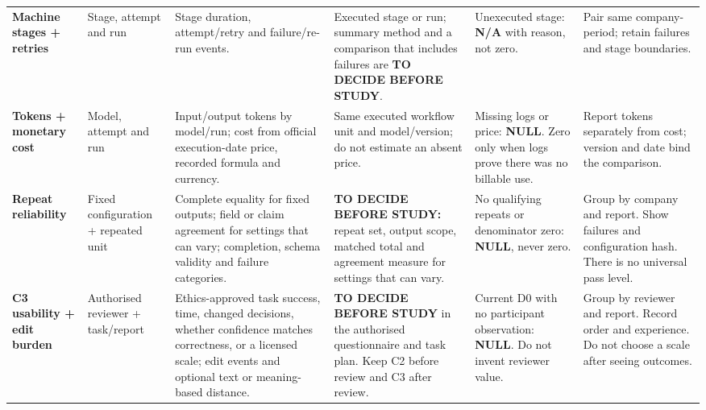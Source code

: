 \begin{longtable}{@{}P{0.14\textwidth}P{0.10\textwidth}P{0.19\textwidth}P{0.195\textwidth}P{0.15\textwidth}P{0.175\textwidth}@{}}
    \addlinespace[1.5pt]
    \textbf{Machine stages + retries} &
    Stage, attempt and run &
    Stage duration, attempt/retry and failure/re-run events. &
    Executed stage or run; summary method and a comparison that includes failures are \textbf{TO DECIDE BEFORE STUDY}. &
    Unexecuted stage: \textbf{N/A} with reason, not zero. &
    Pair same company-period; retain failures and stage boundaries. \\

    \addlinespace[1.5pt]
    \textbf{Tokens + monetary cost} &
    Model, attempt and run &
    Input/output tokens by model/run; cost from official execution-date price, recorded formula and currency. &
    Same executed workflow unit and model/version; do not estimate an absent price. &
    Missing logs or price: \textbf{NULL}. Zero only when logs prove there was no billable use. &
    Report tokens separately from cost; version and date bind the comparison. \\

    \addlinespace[1.5pt]
    \textbf{Repeat reliability} &
    Fixed configuration + repeated unit &
    Complete equality for fixed outputs; field or claim agreement for settings that can vary; completion, schema validity and failure categories. &
    \textbf{TO DECIDE BEFORE STUDY:} repeat set, output scope, matched total and agreement measure for settings that can vary. &
    No qualifying repeats or denominator zero: \textbf{NULL}, never zero. &
    Group by company and report. Show failures and configuration hash. There is no universal pass level. \\

    \addlinespace[1.5pt]
    \textbf{C3 usability + edit burden} &
    Authorised reviewer + task/report &
    Ethics-approved task success, time, changed decisions, whether confidence matches correctness, or a licensed scale; edit events and optional text or meaning-based distance. &
    \textbf{TO DECIDE BEFORE STUDY} in the authorised questionnaire and task plan. Keep C2 before review and C3 after review. &
    Current D0 with no participant observation: \textbf{NULL}. Do not invent reviewer value. &
    Group by reviewer and report. Record order and experience. Do not choose a scale after seeing outcomes. \\


\end{longtable}
